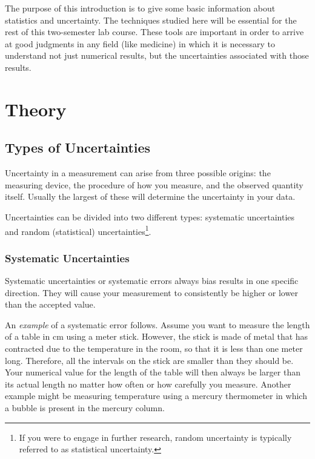 The purpose of this introduction is to give some basic information about statistics and uncertainty. The techniques studied here will be essential for the rest of this two-semester lab course. These tools are important in order to arrive at good judgments in any field (like medicine) in which it is necessary to understand not just numerical results, but the uncertainties associated with those results.

\section{Theory}

\subsection{Types of Uncertainties}

Uncertainty in a measurement can arise from three possible origins: the measuring device, the procedure of how you measure, and the observed quantity itself. Usually the largest of these will determine the uncertainty in your data. \myskip

Uncertainties can be divided into two different types: systematic uncertainties and random (statistical) uncertainties\footnote{If you were to engage in further research, random uncertainty is typically referred to as statistical uncertainty.}.

\subsubsection{Systematic Uncertainties}


Systematic uncertainties or systematic errors always bias results in one specific direction. They will cause your measurement to consistently be higher or lower than the accepted value. \myskip

An \emph{example} of a systematic error follows. Assume you want to measure the length of a table in cm using a meter stick. However, the stick is made of metal that has contracted due to the temperature in the room, so that it is less than one meter long. Therefore, all the intervals on the stick are smaller than they should be. Your numerical value for the length of the table will then always be larger than its actual length no matter how often or how carefully you measure. Another example might be measuring temperature using a mercury thermometer in which a bubble is present in the mercury column. \myskip

